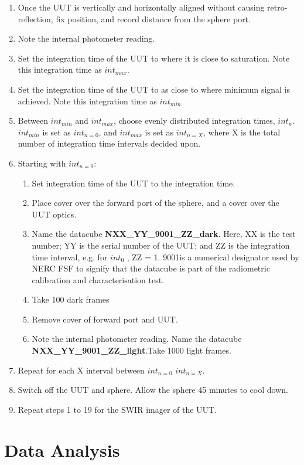 \documentclass[nohyper,nobib]{tufte-book}
\begin{document}
\begin{enumerate}
\begin{enumerate}
		\end{enumerate}
	\item Once the UUT is vertically and horizontally aligned without causing retro-reflection, fix position, and record distance from the sphere port. 
	\item Note the internal photometer reading. 
	\item Set the integration time of the UUT to where it is close to saturation. Note this integration time as $int_{max}$.
	\item Set the integration time of the UUT to as close to where minimum signal is achieved. Note this integration time as $int_{min}$
	\item Between $int_{min}$ and $int_{max}$, choose evenly distributed integration times, $int_{n}$. $int_{min}$ is set as $int_{n = 0}$, and $int_{max}$ is set as $int_{n = X}$, where X is the total number of integration time intervals decided upon.  
	\item Starting with $int_{n = 0}$:
		\begin{enumerate}
			\item Set integration time of the UUT to the integration time.
			\item Place cover over the forward port of the sphere, and a cover over the UUT optics.
			\item Name the datacube \textbf{NXX\_YY\_9001\_ZZ\_dark}. Here, XX is the test number; YY is the serial number of the UUT; and ZZ is the integration time interval, e.g. for  $int_{0}$ , ZZ = 1. 9001is a numerical designator used by NERC FSF to signify that the datacube is part of the radiometric calibration and characterisation test. 
			\item Take 100 dark frames
			\item Remove cover of forward port and UUT.
			\item Note the internal photometer reading. Name the datacube \textbf{NXX\_YY\_9001\_ZZ\_light}.Take 1000 light frames. 
		\end{enumerate}
	\item Repeat for each X interval between $int_{n = 0}$ $int_{n = X}$.
	\item Switch off the UUT and sphere. Allow the sphere 45 minutes to cool down.
	\item Repeat steps 1 to 19 for the SWIR imager of the UUT. 
\end{enumerate}

\chapter{Data Analysis}
\label{ch:rad-data}
\end{document}
